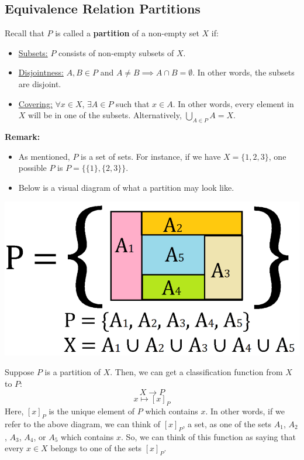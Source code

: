 \documentclass[letterpaper]{article}
\begin{document}
\subsection{Equivalence Relation Partitions}
Recall that $P$ is called a \textbf{partition} of a non-empty set $X$ if:
\begin{itemize}
    \item \underline{Subsets:} $P$ consists of non-empty subsets of $X$. 
    \item \underline{Disjointness:} $A, B \in P$ and $A \neq B \implies A \cap B = \emptyset$. In other words, the subsets are disjoint. 
    \item \underline{Covering:} $\forall x \in X$, $\exists A \in P$ such that $x \in A$. In other words, every element in $X$ will be in one of the subsets. Alternatively, $\bigcup_{A \in P} A = X$. 
\end{itemize}

\textbf{Remark:}
\begin{itemize}
    \item As mentioned, $P$ is a set of sets. For instance, if we have $X = \{1, 2, 3\}$, one possible $P$ is $P = \{\{1\}, \{2, 3\}\}$.
    \item Below is a visual diagram of what a partition may look like.
\end{itemize}
\begin{center}
    \includegraphics[scale=0.4]{assets/partition.PNG}
\end{center}

Suppose $P$ is a partition of $X$. Then, we can get a classification function from $X$ to $P$:
\[X \to P\]
\[x \mapsto [x]_P\]
Here, $[x]_P$ is the unique element of $P$ which contains $x$. In other words, if we refer to the above diagram, we can think of $[x]_P$, a set, as one of the sets $A_1$, $A_2$, $A_3$, $A_4$, or $A_5$ which contains $x$. So, we can think of this function as saying that every $x \in X$ belongs to one of the sets $[x]_P$. 
\end{document}
